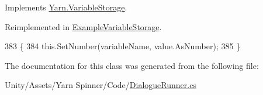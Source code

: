 Implements \hyperlink{a00102_aa90ff61224432c5ed3ce72199c55f440}{Yarn.\-Variable\-Storage}.



Reimplemented in \hyperlink{a00047_ac4265c1c9da485f13a6b05784b0f668d}{Example\-Variable\-Storage}.


\begin{DoxyCode}
383                                                                        \{
384             this.SetNumber(variableName, value.AsNumber);
385         \}
\end{DoxyCode}


The documentation for this class was generated from the following file\-:\begin{DoxyCompactItemize}
\item 
Unity/\-Assets/\-Yarn Spinner/\-Code/\hyperlink{a00126}{Dialogue\-Runner.\-cs}\end{DoxyCompactItemize}
